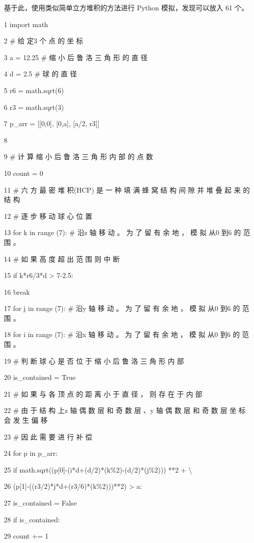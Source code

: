 基于此，使用类似简单立方堆积的方法进行 Python 模拟，发现可以放入 61 个。\par
1 import math\par
2 \# 给 定3 个 点 的 坐 标\par
3 a = 12.25 \# 缩 小 后 鲁 洛 三 角 形 的 直 径\par
4 d = 2.5 \# 球 的 直 径\par
5 r6 = math.sqrt(6)\par
6 r3 = math.sqrt(3)\par
7 p\_arr = [[0,0], [0,a], [a/2, r3]]\par
8\par
9 \# 计 算 缩 小 后 鲁 洛 三 角 形 内 部 的 点 数\par
10 count = 0\par
11 \# 六 方 最 密 堆 积(HCP) 是 一 种 填 满 蜂 窝 结 构 间 隙 并 堆 叠 起 来 的 结 构\par
12 \# 逐 步 移 动 球 心 位 置\par
13 for k in range (7): \# 沿z 轴 移 动 。 为 了 留 有 余 地 ， 模 拟 从0 到6 的 范 围 。\par
14 \# 如 果 高 度 超 出 范 围 则 中 断\par
15 if k*r6/3*d > 7-2.5:\par
16 break\par
17 for j in range (7): \# 沿y 轴 移 动 。 为 了 留 有 余 地 ， 模 拟 从0 到6 的 范 围 。\par
18 for i in range (7): \# 沿x 轴 移 动 。 为 了 留 有 余 地 ， 模 拟 从0 到6 的 范 围 。\par
19 \# 判 断 球 心 是 否 位 于 缩 小 后 鲁 洛 三 角 形 内 部\par
20 is\_contained = True\par
21 \# 如 果 与 各 顶 点 的 距 离 小 于 直 径 ， 则 存 在 于 内 部\par
22 \# 由 于 结 构 上z 轴 偶 数 层 和 奇 数 层 、y 轴 偶 数 层 和 奇 数 层 坐 标 会 发 生 偏 移\par
23 \# 因 此 需 要 进 行 补 偿\par
24 for p in p\_arr:\par
25 if math.sqrt((p[0]-(i*d+(d/2)*(k\%2)-(d/2)*(j\%2))) **2 + \textbackslash{}\par
26 (p[1]-((r3/2)*j*d+(r3/6)*(k\%2)))**2) > a:\par
27 is\_contained = False\par
28 if is\_contained:\par
29 count += 1\par
